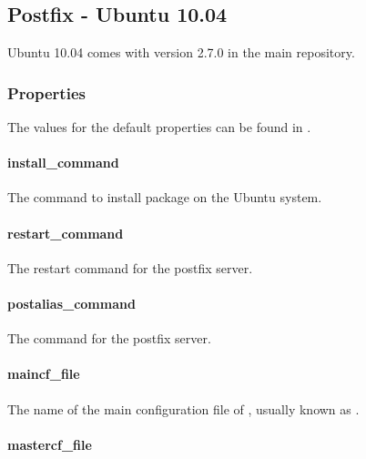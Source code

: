 \label{sec:postfix_ubuntu_10_04_properties}
\subsection{Postfix - Ubuntu 10.04}

Ubuntu 10.04 comes with  version 2.7.0 in the main repository.

\subsubsection{Properties}

The values for the default properties can be found
in .

\paragraph{install\_command}


The command to install package on the Ubuntu system.

\paragraph{restart\_command}


The restart command for the postfix server.

\paragraph{postalias\_command}


The  command for the postfix server.

\paragraph{maincf\_file}


The name of the main configuration file of , usually known
as .

\paragraph{mastercf\_file}


